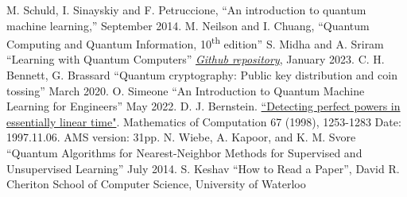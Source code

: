 \documentclass[conference]{IEEEtran}
\begin{document}
\begin{thebibliography}{00}
 M. Schuld, I. Sinayskiy and F. Petruccione, ``An introduction to quantum machine learning,'' September 2014.
 M. Neilson and I. Chuang, ``Quantum Computing and Quantum Information, 10\textsuperscript{th} edition''
 S. Midha and A. Sriram ``Learning with Quantum Computers'' \href{https://github.com/siddhant-midha/WiDS-22-Learning-with-quantum-computers-}{\textit{Github repository}}, January 2023.
 C. H. Bennett, G. Brassard ``Quantum cryptography: Public key distribution and coin tossing'' March 2020.
 O. Simeone ``An Introduction to Quantum Machine Learning for Engineers'' May 2022.
 D. J. Bernstein. \href{http://cr.yp.to/papers/powers-19971106-retypeset20220326.pdf}{``Detecting perfect powers in essentially linear time"}. Mathematics of Computation 67 (1998), 1253-1283 Date: 1997.11.06. AMS version: 31pp.
 N. Wiebe, A. Kapoor, and K. M. Svore ``Quantum Algorithms for Nearest-Neighbor Methods for Supervised and Unsupervised Learning'' July 2014.
 S. Keshav ``How to Read a Paper'', David R. Cheriton School of Computer Science, University of Waterloo
\end{thebibliography}
\vspace{12pt}
\end{document}
